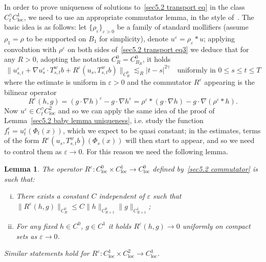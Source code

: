 \documentclass[10pt]{article}
\newcommand{\tmop}[1]{\ensuremath{\operatorname{#1}}}
\newenvironment{enumerateroman}{\begin{enumerate}[i.] }{\end{enumerate}}
\newtheorem{lemma}{Lemma}
\begin{document}
In order to prove uniqueness of solutions to~{\eqref{sec5.2 transport eq}} in
the class $C^{\gamma}_t C^1_{\tmop{loc}}$, we need to use an appropriate
commutator lemma, in the style of~{\cite{diperna}}. The basic idea is as
follows: let $\{ \rho_{\varepsilon} \}_{\varepsilon > 0}$ be a family of
standard mollifiers (assume $\rho_1 = \rho$ to be supported on $B_1$ for
simplicity), denote $u^{\varepsilon} = \rho_{\varepsilon} \ast u$; applying
convolution with $\rho^{\varepsilon}$ on both sides of~{\eqref{sec5.2
transport eq3}} we deduce that for any $R > 0$, adopting the notation $C^0_R =
C^0_{B_R}$, it holds
\[ \| u^{\varepsilon}_{s, t} + \nabla u^{\varepsilon}_s \cdot T^w_{s, t} b +
   R^{\varepsilon} (u_s, T^w_{s, t} b) \|_{C^0_R} \lesssim_R | t - s |^{2
   \gamma} \quad \text{uniformly in } 0 \leqslant s \leqslant t \leqslant T \]
where the estimate is uniform in $\varepsilon > 0$ and the commutator
$R^{\varepsilon}$ appearing is the bilinear operator
\begin{equation}
  R^{\varepsilon} (h, g) = (g \cdot \nabla h)^{\varepsilon} - g \cdot \nabla
  h^{\varepsilon} = \rho^{\varepsilon} \ast (g \cdot \nabla h) - g \cdot
  \nabla (\rho^{\varepsilon} \ast h) . \label{sec5.2 commutator}
\end{equation}
Now $u^{\varepsilon} \in C^{\gamma}_t C^2_{\tmop{loc}}$ and so we can apply
the same idea of the proof of Lemma~\ref{sec5.2 baby lemma uniqueness}, i.e.
study the function $f^{\varepsilon}_t = u^{\varepsilon}_t (\Phi_t (x))$, which
we expect to be quasi constant; in the estimates, terms of the form
$R^{\varepsilon} (u_s, T^w_{s, t} b) (\Phi_s (x))$ will then start to appear,
and so we need to control them as $\varepsilon \rightarrow 0$. For this reason
we need the following lemma.

\begin{lemma}
  \label{sec5.2 lemma baby commutator}The operator $R^{\varepsilon} :
  C_{\tmop{loc}}^0 \times C_{\tmop{loc}}^1 \rightarrow C_{\tmop{loc}}^0$
  defined by~{\eqref{sec5.2 commutator}} is such that:
  \begin{enumerateroman}
    \item There exists a constant $C$ independent of $\varepsilon$ such that
    $\| R^{\varepsilon} (h, g) \|_{C^0_R} \leqslant C \| h \|_{C_{R + 1}^0} \|
    g \|_{C_{R + 1}^1}$;
    
    \item For any fixed $h \in C^0$, $g \in C^1$ it holds $R^{\varepsilon} (h,
    g) \rightarrow 0$ uniformly on compact sets as $\varepsilon \rightarrow
    0$.
  \end{enumerateroman}
  Similar statements hold for $R^{\varepsilon} : C_{\tmop{loc}}^1 \times
  C_{\tmop{loc}}^2 \rightarrow C_{\tmop{loc}}^1$.
\end{lemma}
\end{document}
